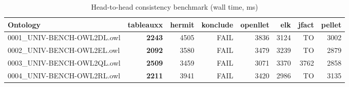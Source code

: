 \begin{table}[t]
\centering
\caption{Head-to-head consistency benchmark (wall time, ms)}
\label{tab:head_to_head_wall_ms}
\begin{tabular}{lrrrrrrr}
\toprule
Ontology & tableauxx & hermit & konclude & openllet & elk & jfact & pellet \\
\midrule
0001\_UNIV-BENCH-OWL2DL.owl & \textbf{2243} & 4505 & FAIL & 3836 & 3124 & TO & 3002 \\
0002\_UNIV-BENCH-OWL2EL.owl & \textbf{2092} & 3580 & FAIL & 3479 & 3239 & TO & 2879 \\
0003\_UNIV-BENCH-OWL2QL.owl & \textbf{2509} & 3459 & FAIL & 3071 & 3370 & 3762 & 2858 \\
0004\_UNIV-BENCH-OWL2RL.owl & \textbf{2211} & 3941 & FAIL & 3420 & 2986 & TO & 3135 \\
\bottomrule
\end{tabular}
\end{table}
